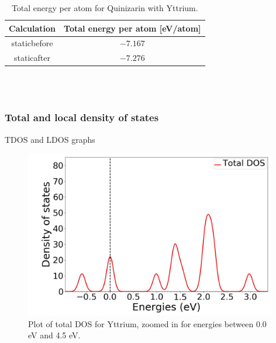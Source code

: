 \documentclass{article}
\begin{document}
      \begin{table}[H]
        \centering
        \caption{Total energy per atom for Quinizarin with Yttrium. }
        \vspace{0mm}
        \label{tab:TOTENY}
        \begin{tabular}{|c|c|}
            \hline
            Calculation & Total energy per atom [eV/atom]  \\
            \hline \hline
            staticbefore & $-7.167$ \\
            staticafter & $-7.276$ \\
            \hline
        \end{tabular} \\
        \hspace{0pt}\\
      \end{table}


    \subsubsection{Total and local density of states}

      TDOS and LDOS graphs

      \begin{figure}[H]
        \centering
        \includegraphics[width = 11cm]{../fig/Y_TDOS_2.png}
        \caption{Plot of total DOS for Yttrium, zoomed in for energies between 0.0 eV and 4.5 eV. }
        \label{fig:Y_TDOS_2.png}
      \end{figure}
\end{document}
